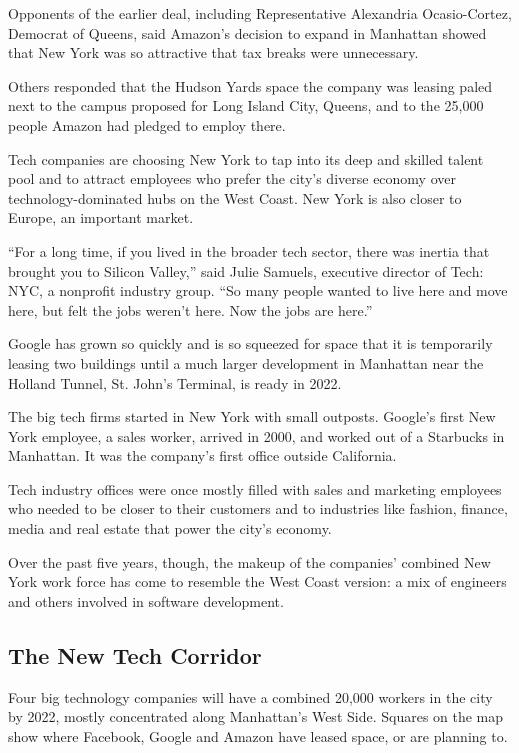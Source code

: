 Opponents of the earlier deal, including Representative Alexandria
Ocasio-Cortez, Democrat of Queens, said Amazon's decision to expand in
Manhattan showed that New York was so attractive that tax breaks were
unnecessary.

Others responded that the Hudson Yards space the company was leasing
paled next to the campus proposed for Long Island City, Queens, and to
the 25,000 people Amazon had pledged to employ there.

Tech companies are choosing New York to tap into its deep and skilled
talent pool and to attract employees who prefer the city's diverse
economy over technology-dominated hubs on the West Coast. New York is
also closer to Europe, an important market.

``For a long time, if you lived in the broader tech sector, there was
inertia that brought you to Silicon Valley,'' said Julie Samuels,
executive director of Tech: NYC, a nonprofit industry group. ``So many
people wanted to live here and move here, but felt the jobs weren't
here. Now the jobs are here.''

Google has grown so quickly and is so squeezed for space that it is
temporarily leasing two buildings until a much larger development in
Manhattan near the Holland Tunnel, St. John's Terminal, is ready in
2022.

The big tech firms started in New York with small outposts. Google's
first New York employee, a sales worker, arrived in 2000, and worked out
of a Starbucks in Manhattan. It was the company's first office outside
California.

Tech industry offices were once mostly filled with sales and marketing
employees who needed to be closer to their customers and to industries
like fashion, finance, media and real estate that power the city's
economy.

Over the past five years, though, the makeup of the companies' combined
New York work force has come to resemble the West Coast version: a mix
of engineers and others involved in software development.

\hypertarget{the-new-tech-corridor}{%
\subsection{The New Tech Corridor}\label{the-new-tech-corridor}}

Four big technology companies will have a combined 20,000 workers in the
city by 2022, mostly concentrated along Manhattan's West Side. Squares
on the map show where Facebook, Google and Amazon have leased space, or
are planning to.


